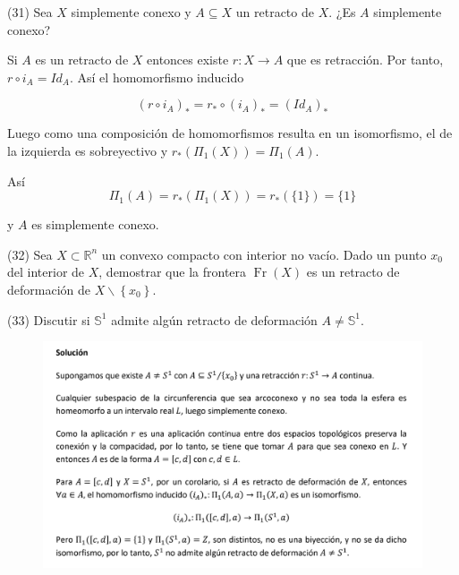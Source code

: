 \documentclass[
  a4paper,
  spanish,
  12pt,
]{scrartcl}
\begin{document}
\begin{ejer}
(31) Sea $X$ simplemente conexo y $A \subseteq X$ un retracto de $X$. ¿Es $A$ simplemente conexo?\\
\end{ejer}

\begin{sol}

Si $A$ es un retracto de $X$ entonces existe $r: X \rightarrow A$ que es retracción.
Por tanto, $r \circ i_A = Id_A$. Así el homomorfismo inducido

$$
(r \circ i_A)_* = r_* \circ (i_A)_* = (Id_A)_*
$$

Luego como una composición de homomorfismos resulta en un isomorfismo, el de la izquierda es sobreyectivo
y $r_*(\Pi_1(X)) = \Pi_1(A)$.

Así
$$
\Pi_1(A) = r_*(\Pi_1(X)) = r_* (\{1\}) = \{1\}
$$

y $A$ es simplemente conexo.
\end{sol}

\begin{ejer}
(32) Sea $X \subset \mathbb{R}^{n}$ un convexo compacto con interior no vacío. Dado un punto $x_{0}$ del interior de $X$, demostrar que la frontera $\operatorname{Fr}(X)$ es un retracto de deformación de $X \backslash\left\{x_{0}\right\}$.\\
\end{ejer}

\begin{ejer}
(33) Discutir si $\mathbb{S}^{1}$ admite algún retracto de deformación $A \neq \mathbb{S}^{1}$.\\
\end{ejer}

\begin{figure}[h]
	\centering
	\includegraphics[width=\textwidth]{ej33.png}
\end{figure}
\end{document}
